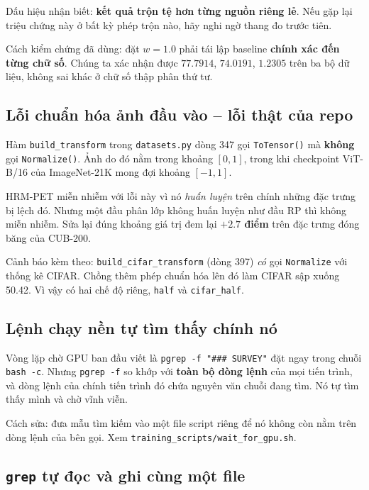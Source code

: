 \documentclass[11pt,a4paper]{article}
\begin{document}
Dấu hiệu nhận biết: \textbf{kết quả trộn tệ hơn từng nguồn riêng lẻ}. Nếu gặp lại
triệu chứng này ở bất kỳ phép trộn nào, hãy nghi ngờ thang đo trước tiên.

Cách kiểm chứng đã dùng: đặt $w = 1.0$ phải tái lập baseline \textbf{chính xác
đến từng chữ số}. Chúng ta xác nhận được $77.7914$, $74.0191$, $1.2305$ trên ba
bộ dữ liệu, không sai khác ở chữ số thập phân thứ tư.

\subsection{Lỗi chuẩn hóa ảnh đầu vào -- lỗi thật của repo}

Hàm \texttt{build\_transform} trong \texttt{datasets.py} dòng 347 gọi
\texttt{ToTensor()} mà \textbf{không} gọi \texttt{Normalize()}. Ảnh do đó nằm
trong khoảng $[0,1]$, trong khi checkpoint ViT-B/16 của ImageNet-21K mong đợi
khoảng $[-1,1]$.

HRM-PET miễn nhiễm với lỗi này vì nó \emph{huấn luyện} trên chính những đặc trưng
bị lệch đó. Nhưng một đầu phân lớp không huấn luyện như đầu RP thì không miễn
nhiễm. Sửa lại đúng khoảng giá trị đem lại \textbf{$+2.7$ điểm} trên đặc trưng
đóng băng của CUB-200.

Cảnh báo kèm theo: \texttt{build\_cifar\_transform} (dòng 397) \emph{có} gọi
\texttt{Normalize} với thống kê CIFAR. Chồng thêm phép chuẩn hóa lên đó làm CIFAR
sập xuống 50.42. Vì vậy có hai chế độ riêng, \texttt{half} và
\texttt{cifar\_half}.

\subsection{Lệnh chạy nền tự tìm thấy chính nó}

Vòng lặp chờ GPU ban đầu viết là \texttt{pgrep -f "\#\#\# SURVEY"} đặt ngay trong
chuỗi \texttt{bash -c}. Nhưng \texttt{pgrep -f} so khớp với \textbf{toàn bộ dòng
lệnh} của mọi tiến trình, và dòng lệnh của chính tiến trình đó chứa nguyên văn
chuỗi đang tìm. Nó tự tìm thấy mình và chờ vĩnh viễn.

Cách sửa: đưa mẫu tìm kiếm vào một file script riêng để nó không còn nằm trên
dòng lệnh của bên gọi. Xem \texttt{training\_scripts/wait\_for\_gpu.sh}.

\subsection{\texttt{grep} tự đọc và ghi cùng một file}
\end{document}
